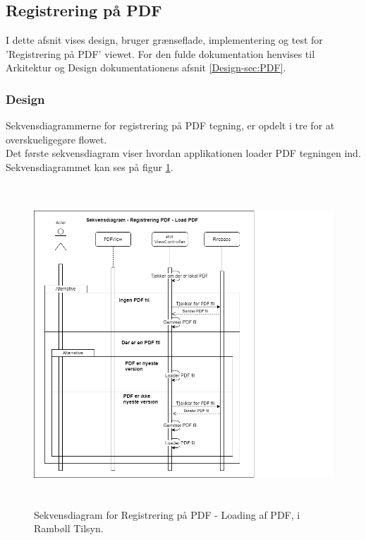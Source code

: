 \subsection{Registrering på PDF}
I dette afsnit vises design, bruger grænseflade, implementering og test for 'Registrering på PDF' viewet. For den fulde dokumentation henvises til Arkitektur og Design dokumentationens afsnit \ref{Design-sec:PDF}.
\subsubsection{Design}
Sekvensdiagrammerne for registrering på PDF tegning, er opdelt i tre for at overskueligegøre flowet. \\
Det første sekvensdiagram viser hvordan applikationen loader PDF tegningen ind. Sekvensdiagrammet kan ses på figur \ref{fig:LoadPDFSekvensDiagram}.
\begin{figure}[H] %
	\centering
	\includegraphics[height=12cm, width=15cm]{Design/Applikation/RegistrePDF/LoadPDFSekvensDiagram}
	\caption{Sekvensdiagram for Registrering på PDF - Loading af PDF, i Rambøll Tilsyn.}
	\label{fig:LoadPDFSekvensDiagram}
\end{figure}

\clearpage

